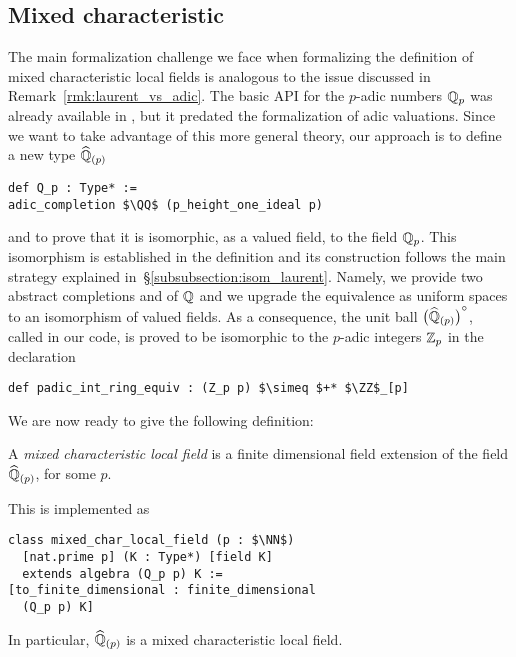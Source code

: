 \documentclass[sigplan,10pt, nonacm, review]{acmart}
\begin{document}
\subsection{Mixed characteristic}\label{subsec:mixed_char}
The main formalization challenge we face when formalizing the definition of mixed characteristic local fields is analogous to the issue discussed in Remark~\ref{rmk:laurent_vs_adic}. The basic API for the $p$-adic numbers $\mathbb{Q}_p$ was already available in \mathlib, but it predated the formalization of adic valuations. Since we want to take advantage of this more general theory, our approach is to define a new type $\widehat{\mathbb{Q}}_{(p)}$\href{https://github.com/LCFT-Lean/local_fields/blob/76ad487d09babdb0018f394a5634526637ee014a/src/padic_compare.lean#L89}{\extlink}
\begin{lstlisting}
def Q_p : Type* := 
adic_completion $\QQ$ (p_height_one_ideal p)
\end{lstlisting}
and to prove that it is isomorphic, as a valued field, to the field $\mathbb{Q}_p$. This isomorphism is established in the definition \href{https://github.com/LCFT-Lean/local_fields/blob/76ad487d09babdb0018f394a5634526637ee014a/src/padic_compare.lean#L268}{\extlink} and its construction follows the main strategy explained in~\S\ref{subsubsection:isom_laurent}. Namely, we provide two abstract completions  and  of $\mathbb{Q}$ and we upgrade the equivalence as uniform spaces to an isomorphism of valued fields. As a consequence, the unit ball ${\bigl(\widehat{\mathbb{Q}}_{(p)}\bigr)}^\circ$, called\href{https://github.com/LCFT-Lean/local_fields/blob/76ad487d09babdb0018f394a5634526637ee014a/src/padic_compare.lean#L326}{\extlink}  in our code,
is proved to be isomorphic to the $p$-adic integers $\mathbb{Z}_p$ in the declaration\href{https://github.com/LCFT-Lean/local_fields/blob/76ad487d09babdb0018f394a5634526637ee014a/src/padic_compare.lean#L567}{\extlink}
\begin{lstlisting}[caption={The isomorphism between $\padicComplInt$ and $\ZZ_p$.}, label={code:iso_Zp}]
def padic_int_ring_equiv : (Z_p p) $\simeq $+* $\ZZ$_[p]
\end{lstlisting}

We are now ready to give the following definition:
\begin{definition}\label{def:mixed_char_local_field}
A \emph{mixed characteristic local field} is a finite dimensional field extension of the field $\widehat{\mathbb{Q}}_{(p)}$, for some $p$.
\end{definition}
This is implemented as\href{https://github.com/LCFT-Lean/local_fields/blob/76ad487d09babdb0018f394a5634526637ee014a/src/mixed_characteristic/basic.lean#L36}{\extlink}
\begin{lstlisting}
class mixed_char_local_field (p : $\NN$)
  [nat.prime p] (K : Type*) [field K]
  extends algebra (Q_p p) K :=
[to_finite_dimensional : finite_dimensional
  (Q_p p) K]    
\end{lstlisting}
In particular, $\widehat{\mathbb{Q}}_{(p)}$ is a mixed characteristic local field\href{https://github.com/LCFT-Lean/local_fields/blob/76ad487d09babdb0018f394a5634526637ee014a/src/mixed_characteristic/basic.lean#L123}{\extlink}.
\end{document}
